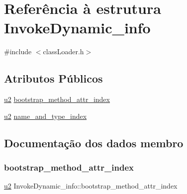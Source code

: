 \hypertarget{struct_invoke_dynamic__info}{}\section{Referência à estrutura Invoke\+Dynamic\+\_\+info}
\label{struct_invoke_dynamic__info}


{\ttfamily \#include $<$class\+Loader.\+h$>$}

\subsection*{Atributos Públicos}
\begin{DoxyCompactItemize}
\item 
\hyperlink{util_8h_a55ef8d87fd202b8417704c089899c5b9}{u2} \hyperlink{struct_invoke_dynamic__info_ab60ea9da5ce17d1d43a04c75b0e0466c}{bootstrap\+\_\+method\+\_\+attr\+\_\+index}
\item 
\hyperlink{util_8h_a55ef8d87fd202b8417704c089899c5b9}{u2} \hyperlink{struct_invoke_dynamic__info_a68d47a56c58c6d39d78085a648652863}{name\+\_\+and\+\_\+type\+\_\+index}
\end{DoxyCompactItemize}


\subsection{Documentação dos dados membro}
\mbox{\label{struct_invoke_dynamic__info_ab60ea9da5ce17d1d43a04c75b0e0466c}} 
\subsubsection{\texorpdfstring{bootstrap\+\_\+method\+\_\+attr\+\_\+index}{bootstrap\_method\_attr\_index}}
{\footnotesize\ttfamily \hyperlink{util_8h_a55ef8d87fd202b8417704c089899c5b9}{u2} Invoke\+Dynamic\+\_\+info\+::bootstrap\+\_\+method\+\_\+attr\+\_\+index}

\mbox{\label{struct_invoke_dynamic__info_a68d47a56c58c6d39d78085a648652863}} 
